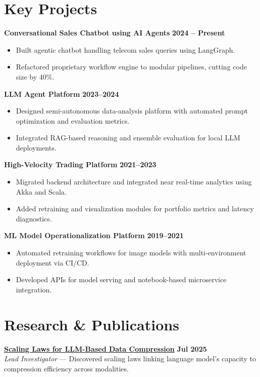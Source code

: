 \documentclass[11pt]{article}
\begin{document}
\newpage
\section{Key Projects}
\textbf{Conversational Sales Chatbot using AI Agents} \hfill \textbf{2024 – Present}\\
\begin{itemize}[leftmargin=*,nosep]
\item Built agentic chatbot handling telecom sales queries using LangGraph.
\item Refactored proprietary workflow engine to modular pipelines, cutting code size by 40\%.
\end{itemize}

\textbf{LLM Agent Platform} \hfill \textbf{2023–2024}\\
\begin{itemize}[leftmargin=*,nosep]
\item Designed semi-autonomous data-analysis platform with automated prompt optimization and evaluation metrics.
\item Integrated RAG-based reasoning and ensemble evaluation for local LLM deployments.
\end{itemize}

\textbf{High-Velocity Trading Platform} \hfill \textbf{2021–2023}\\
\begin{itemize}[leftmargin=*,nosep]
\item Migrated backend architecture and integrated near real-time analytics using Akka and Scala.
\item Added retraining and visualization modules for portfolio metrics and latency diagnostics.
\end{itemize}

\textbf{ML Model Operationalization Platform} \hfill \textbf{2019–2021}\\
\begin{itemize}[leftmargin=*,nosep]
\item Automated retraining workflows for image models with multi-environment deployment via CI/CD.
\item Developed APIs for model serving and notebook-based microservice integration.
\end{itemize}

\section{Research \& Publications}
\textbf{\href{https://fullwrong.com/2025/07/23/scaling-compression/}{Scaling Laws for LLM-Based Data Compression}} \hfill \textbf{Jul 2025}\\
\textit{Lead Investigator} — Discovered scaling laws linking language model's capacity to compression efficiency across modalities.
\end{document}
